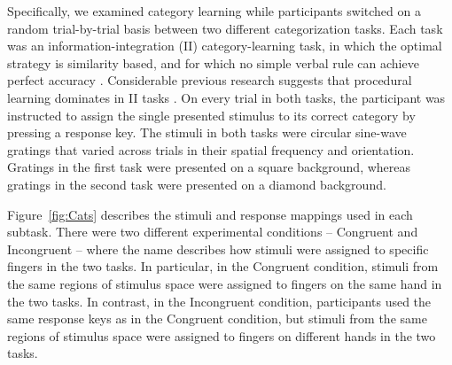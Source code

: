 \documentclass[doc, floatsintext]{apa7}
\begin{document}
Specifically, we examined category learning while participants switched on a random trial-by-trial basis between two different categorization tasks. Each task was an information-integration (II) category-learning task, in which the optimal strategy is similarity based, and for which no simple verbal rule can achieve perfect accuracy \parencite{ashby_neuropsychological_1998, ashby_decision_1988}. Considerable previous research suggests that procedural learning dominates in II tasks \parencite[e.g.,][]{ashby_multiple_2017}.   On every trial in both tasks, the participant was instructed to assign the single presented stimulus to its correct
category by pressing a response key. The stimuli in both tasks were circular sine-wave gratings that varied across trials in their spatial frequency and orientation.   Gratings in the first task were presented on a square background, whereas gratings in the second task were presented on a diamond background. 

Figure~\ref{fig:Cats} describes the stimuli and response mappings used in each subtask. There were two different experimental conditions -- Congruent and Incongruent -- where the name describes how stimuli were assigned to specific fingers in the two tasks. In particular, in the Congruent condition, stimuli from the same regions of stimulus space were assigned to fingers on the same hand in the two tasks. In contrast, in the Incongruent condition, participants used the same response keys as in the Congruent condition, but stimuli from the same regions of stimulus space were assigned to fingers on different hands in the two tasks. 
\end{document}

